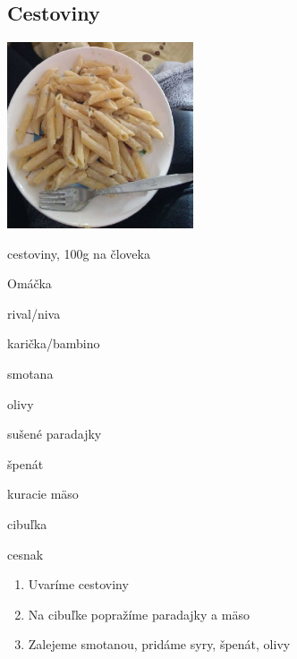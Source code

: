 \setcounter{step}{0}
\subsection{Cestoviny}

\begin{ingredient}
\includegraphics[height=5.5cm]{images/cestoviny}
\def\portions{4}%

\begin{main}
	\item cestoviny, 100g na človeka
\end{main}
\begin{subingredient}{Omáčka}
	\item rival/niva
	\item karička/bambino
	\item smotana
	\item olivy
	\item sušené paradajky 
	\item špenát 
	\item kuracie mäso
	\item cibuľka 
	\item cesnak
\end{subingredient}
\end{ingredient}
\begin{recipe}

\begin{enumerate}

\item{Uvaríme cestoviny}
\item{Na cibuľke popražíme paradajky a mäso}
\item{Zalejeme smotanou, pridáme syry, špenát, olivy}	

\end{enumerate}
\end{recipe}

\begin{notes}

\end{notes}
\clearpage	